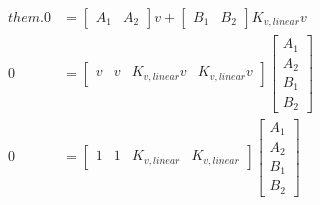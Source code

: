 \begin{align*}
{    them.}
  0 &=
    \begin{bmatrix}
      A_1 & A_2
    \end{bmatrix} v +
    \begin{bmatrix}
      B_1 & B_2
    \end{bmatrix} K_{v,linear} v \\
  0 &=
    \begin{bmatrix}
      v & v & K_{v,linear} v & K_{v,linear} v
    \end{bmatrix}
    \begin{bmatrix}
      A_1 \\
      A_2 \\
      B_1 \\
      B_2
    \end{bmatrix} \\
  0 &=
    \begin{bmatrix}
      1 & 1 & K_{v,linear} & K_{v,linear}
    \end{bmatrix}
    \begin{bmatrix}
      A_1 \\
      A_2 \\
      B_1 \\
      B_2
    \end{bmatrix}
\end{align*}


